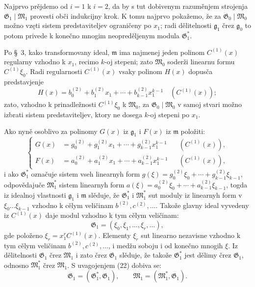 \documentclass[11pt]{article}
\providecommand{\Gmod}{\mathfrak G}
\providecommand{\Mmod}{\mathfrak M}
\providecommand{\mideal}{\mathfrak m}
\providecommand{\gideal}{\mathfrak g}
\begin{document}
Najprvo prějdemo od $i=1$ k $i=2$, da by s tut dobivenym razuměnjem strojenja $\Gmod_1\mid\Mmod_1$ provesti obči indukcijny krok. K tomu najprvo pokažemo, že za $\Gmod_0\mid\Mmod_0$ možno vzęti sistem predstaviteljev ograničeny po $x_1$; radi dělitelnosti $\gideal_1$ črez $\gideal_0$ to potom privede k konečno mnogim neopreděljenym modula $\Gmod^*_1$.

Po §~3, kako transformovany ideal, $\mideal$ ima najmenej jeden polinom $C^{(1)}(x)$ regularny vzhodno k $x_1$, recimo $k$-oj stepeni; zato $\Mmod_0$ soderži linearnu formu $C^{(1)}\xi_0$. Radi regularnosti $C^{(1)}(x)$ vsaky polinom $H(x)$ dopusča predstavjenje
\begin{equation}
 H(x)=b^{(2)}_0+b^{(2)}_1x_1+\cdots+b^{(2)}_{k-1}x_1^{k-1}\quad (C^{(1)}(x));
\tag{21}
\end{equation}
zato, vzhodno k prinadležnosti $C^{(1)}\xi_0$ k $\Mmod_0$, za $\Gmod_0\mid\Mmod_0$ v samoj stvari možno izbrati sistem predstaviteljev, ktory ne dosega $k$-oj stepeni po $x_1$.

Ako nyně osoblivo za polinomy $G(x)$ iz $\gideal_1$ i $F(x)$ iz $\mideal$ položiti:
\begin{equation}
 \left\{\begin{aligned}
  G(x)&=g^{(2)}_0+g^{(2)}_1x_1+\cdots+g^{(2)}_{k-1}x_1^{k-1} &&(C^{(1)}(x)),\\
  F(x)&=a^{(2)}_0+a^{(2)}_1x_1+\cdots+a^{(2)}_{k-1}x_1^{k-1} &&(C^{(1)}(x)),
 \end{aligned}\right.
\tag{22}
\end{equation}
i ako $\Gmod^*_1$ označuje sistem vseh linearnyh form $g(\xi)=g^{(2)}_0\xi_0+\cdots+g^{(2)}_{k-1}\xi_{k-1}$, odpovědajuče $\Mmod^*_1$ sistem linearnyh form $a(\xi)=a^{(2)}_0\xi_0+\cdots+a^{(2)}_{k-1}\xi_{k-1}$, togda iz idealnoj vlastnosti $\gideal_1$ i $\mideal$ slěduje, že $\Gmod^*_1$ i $\Mmod^*_1$ sut moduly iz linearnyh form v $\xi_0\ldots\xi_{k-1}$ vzhodno k cělym veličinam $b^{(2)},c^{(2)},\ldots$. Takože glavny ideal vyvedeny iz $C^{(1)}(x)$ daje modul vzhodno k tym cělym veličinam:
\[
 \Gmod_1=(\xi_0,\xi_1,\ldots,\xi_r,\ldots),
\]
gde položeno $\xi_r=x_1^rC^{(1)}(x)$. Elementy $\xi_r$ sut linearno nezavisne vzhodno k tym cělym veličinam $b^{(2)},c^{(2)},\ldots$, i medžu soboju i od konečno mnogih $\xi$. Iz dělitelnosti $\Gmod_1$ črez $\Mmod_1$ i zato črez $\Gmod_1$ slěduje, že takože $\Gmod^*_1$ jest dělimy črez $\Gmod_1$, odnosno $\Mmod^*_1$ črez $\Mmod_1$. S uvagojenjem (22) dobiva se:
\begin{equation}
 \Gmod_1=(\Gmod^*_1,\Gmod_1),\qquad
 \Mmod_1=(\Mmod^*_1,\Gmod_1).
\tag{23}
\end{equation}
\end{document}

